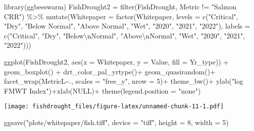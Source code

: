 \documentclass[
]{article}
\newenvironment{Shaded}{\begin{snugshade}}{\end{snugshade}}
\newcommand{\AttributeTok}[1]{\textcolor[rgb]{0.77,0.63,0.00}{#1}}
\newcommand{\ConstantTok}[1]{\textcolor[rgb]{0.00,0.00,0.00}{#1}}
\newcommand{\DecValTok}[1]{\textcolor[rgb]{0.00,0.00,0.81}{#1}}
\newcommand{\FunctionTok}[1]{\textcolor[rgb]{0.00,0.00,0.00}{#1}}
\newcommand{\NormalTok}[1]{#1}
\newcommand{\OtherTok}[1]{\textcolor[rgb]{0.56,0.35,0.01}{#1}}
\newcommand{\SpecialCharTok}[1]{\textcolor[rgb]{0.00,0.00,0.00}{#1}}
\newcommand{\StringTok}[1]{\textcolor[rgb]{0.31,0.60,0.02}{#1}}
\begin{document}
\begin{Shaded}
\begin{Highlighting}[]
\FunctionTok{library}\NormalTok{(ggbeeswarm)}
\NormalTok{FishDrought2 }\OtherTok{=} \FunctionTok{filter}\NormalTok{(FishDrought, Metric }\SpecialCharTok{!=} \StringTok{"Salmon CRR"}\NormalTok{) }\SpecialCharTok{\%\textgreater{}\%}
  \FunctionTok{mutate}\NormalTok{(}\AttributeTok{Whitepaper =} \FunctionTok{factor}\NormalTok{(Whitepaper, }\AttributeTok{levels =} \FunctionTok{c}\NormalTok{(}\StringTok{"Critical"}\NormalTok{, }\StringTok{"Dry"}\NormalTok{, }\StringTok{"Below Normal"}\NormalTok{, }\StringTok{"Above Normal"}\NormalTok{, }\StringTok{"Wet"}\NormalTok{, }\StringTok{"2020"}\NormalTok{, }\StringTok{"2021"}\NormalTok{, }\StringTok{"2022"}\NormalTok{),}
                             \AttributeTok{labels =} \FunctionTok{c}\NormalTok{(}\StringTok{"Critical"}\NormalTok{, }\StringTok{"Dry"}\NormalTok{, }\StringTok{"Below}\SpecialCharTok{\textbackslash{}n}\StringTok{Normal"}\NormalTok{, }\StringTok{"Above}\SpecialCharTok{\textbackslash{}n}\StringTok{Normal"}\NormalTok{, }\StringTok{"Wet"}\NormalTok{, }\StringTok{"2020"}\NormalTok{, }\StringTok{"2021"}\NormalTok{, }\StringTok{"2022"}\NormalTok{)))}
  

\FunctionTok{ggplot}\NormalTok{(FishDrought2,  }\FunctionTok{aes}\NormalTok{(}\AttributeTok{x =}\NormalTok{ Whitepaper, }\AttributeTok{y =}\NormalTok{ Value, }\AttributeTok{fill =}\NormalTok{ Yr\_type)) }\SpecialCharTok{+} 
  \FunctionTok{geom\_boxplot}\NormalTok{() }\SpecialCharTok{+}
  \FunctionTok{drt\_color\_pal\_yrtype}\NormalTok{()}\SpecialCharTok{+}
  \FunctionTok{geom\_quasirandom}\NormalTok{()}\SpecialCharTok{+}
  \FunctionTok{facet\_wrap}\NormalTok{(MetricL}\SpecialCharTok{\textasciitilde{}}\NormalTok{., }\AttributeTok{scales =} \StringTok{"free\_y"}\NormalTok{, }\AttributeTok{nrow =} \DecValTok{5}\NormalTok{)}\SpecialCharTok{+} \FunctionTok{theme\_bw}\NormalTok{()}\SpecialCharTok{+}
   \FunctionTok{ylab}\NormalTok{(}\StringTok{"log FMWT Index"}\NormalTok{)}\SpecialCharTok{+}\FunctionTok{xlab}\NormalTok{(}\ConstantTok{NULL}\NormalTok{)}\SpecialCharTok{+}
  \FunctionTok{theme}\NormalTok{(}\AttributeTok{legend.position =} \StringTok{"none"}\NormalTok{)}
\end{Highlighting}
\end{Shaded}

\texttt{[image: fishdrought\_files/figure-latex/unnamed-chunk-11-1.pdf]}

\begin{Shaded}
\begin{Highlighting}[]
\FunctionTok{ggsave}\NormalTok{(}\StringTok{"plots/whitepaper/fish.tiff"}\NormalTok{, }\AttributeTok{device =} \StringTok{"tiff"}\NormalTok{, }\AttributeTok{height =} \DecValTok{8}\NormalTok{, }\AttributeTok{width =} \DecValTok{5}\NormalTok{)}
\end{Highlighting}
\end{Shaded}
\end{document}
